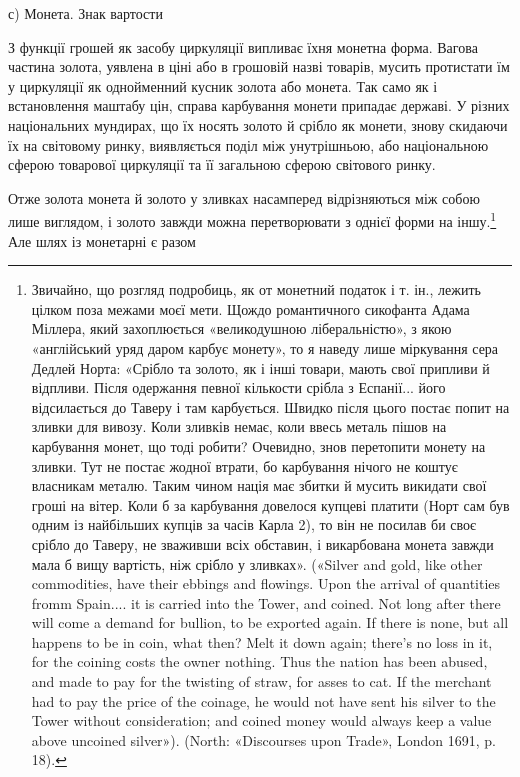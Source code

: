 с) Монета. Знак вартости

З функції грошей як засобу циркуляції випливає їхня монетна
форма. Вагова частина золота, уявлена в ціні або в грошовій
назві товарів, мусить протистати їм у циркуляції як однойменний
кусник золота або монета. Так само як і встановлення маштабу
цін, справа карбування монети припадає державі. У різних національних
мундирах, що їх носять золото й срібло як монети,
знову скидаючи їх на світовому ринку, виявляється поділ між
унутрішньою, або національною сферою товарової циркуляції
та її загальною сферою світового ринку.

Отже золота монета й золото у зливках насамперед відрізняються
між собою лише виглядом, і золото завжди можна перетворювати
з однієї форми на іншу.\footnote{
Звичайно, що розгляд подробиць, як от монетний податок і т. ін.,
лежить цілком поза межами моєї мети. Щождо романтичного сикофанта
Адама Міллера, який захоплюється «великодушною ліберальністю», з
якою «англійський уряд даром карбує монету», то я наведу лише міркування
сера Дедлей Норта: «Срібло та золото, як і інші товари, мають свої
припливи й відпливи. Після одержання певної кількости срібла з Еспанії...
його відсилається до Таверу і там карбується. Швидко після цього постає
попит на зливки для вивозу. Коли зливків немає, коли ввесь металь пішов
на карбування монет, що тоді робити? Очевидно, знов перетопити монету
на зливки. Тут не постає жодної втрати, бо карбування нічого не коштує
власникам металю. Таким чином нація має збитки й мусить викидати
свої гроші на вітер. Коли б за карбування довелося купцеві платити
(Норт сам був одним із найбільших купців за часів Карла 2), то він не
посилав би своє срібло до Таверу, не зваживши всіх обставин, і викарбована
монета завжди мала б вищу вартість, ніж срібло у зливках». («Silver
and gold, like other commodities, have their ebbings and flowings. Upon
the arrival of quantities fromm Spain.... it is carried into the Tower, and
coined. Not long after there will come a demand for bullion, to be exported
again. If there is none, but all happens to be in coin, what then? Melt
it down again; there’s no loss in it, for the coining costs the owner nothing.
Thus the nation has been abused, and made to pay for the twisting of
straw, for asses to cat. If the merchant had to pay the price of the coinage,
he would not have sent his silver to the Tower without consideration; and
coined money would always keep a value above uncoined silver»). (North:
«Discourses upon Trade», London 1691, p. 18).
} Але шлях із монетарні є разом
